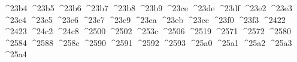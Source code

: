 {  ^^^^23b4%
  ^^^^23b5%
  ^^^^23b6%
  ^^^^23b7%
  ^^^^23b8%
  ^^^^23b9%
  ^^^^23ce%
  ^^^^23de%
  ^^^^23df%
  ^^^^23e2%
  ^^^^23e3%
  ^^^^23e4%
  ^^^^23e5%
  ^^^^23e6%
  ^^^^23e7%
  ^^^^23e9%
  ^^^^23ea%
  ^^^^23eb%
  ^^^^23ec%
  ^^^^23f0%
  ^^^^23f3%
  ^^^^2422%
  ^^^^2423%
  ^^^^24c2%
  ^^^^24c8%
  ^^^^2500%
  ^^^^2502%
  ^^^^253c%
  ^^^^2506%
  ^^^^2519%
  ^^^^2571%
  ^^^^2572%
  ^^^^2580%
  ^^^^2584%
  ^^^^2588%
  ^^^^258c%
  ^^^^2590%
  ^^^^2591%
  ^^^^2592%
  ^^^^2593%
  ^^^^25a0%
  ^^^^25a1%
  ^^^^25a2%
  ^^^^25a3%
  ^^^^25a4%
}
